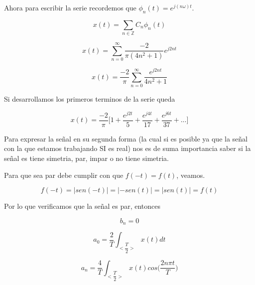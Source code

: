 Ahora para escribir la serie recordemos que $\phi_n (t) = e^{j(n\omega)t}$.

$$x(t) = \sum_{n \in \mathbb{Z}} C_n \phi_n (t)$$

$$x(t) = \sum_{n=0}^{\infty} \dfrac{-2}{\pi(4n^2+1)} e^{j2nt} $$

$$x(t) = \dfrac{-2}{\pi} \sum_{n=0}^{\infty} \dfrac{e^{j2nt}}{4n^2+1}$$

Si desarrollamos los primeros terminos de la serie queda

$$x(t) = \dfrac{-2}{\pi} \bigg[1 + \dfrac{e^{j2t}}{5} + \dfrac{e^{j4t}}{17} + \dfrac{e^{j6t}}{37} + ... \bigg] $$

Para expresar la se\~nal en su segunda forma (la cual si es posible ya que la se\~nal con la que estamos trabajando SI es real) nos es de suma importancia saber si la se\~nal es tiene simetria, par, impar o no tiene simetria.

Para que sea par debe cumplir con que $f(-t) = f(t)$, veamos.

$$f(-t) = |sen(-t)| = |-sen(t)| = |sen(t)| = f(t) $$

Por lo que verificamos que la se\~nal es par, entonces

$$b_n = 0 $$

$$a_0 = \dfrac{2}{T} \int_{<\dfrac{T}{2}>} x(t) dt $$

$$a_n = \dfrac{4}{T} \int_{<\dfrac{T}{2}>} x(t) cos \bigg(\dfrac{2n\pi t}{T} \bigg) $$
